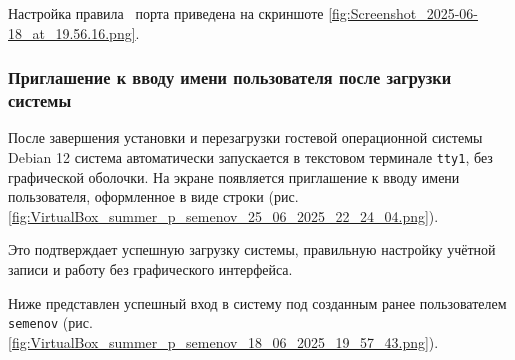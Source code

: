 Настройка правила \frqq\ порта приведена на скриншоте \ref{fig:Screenshot_2025-06-18_at_19.56.16.png}.


\subsubsection*{Приглашение к вводу имени пользователя после загрузки системы}

После завершения установки и перезагрузки гостевой операционной системы Debian 12 система автоматически запускается в текстовом терминале \texttt{tty1}, без графической оболочки. На экране появляется приглашение к вводу имени пользователя, оформленное в виде строки (рис. \ref{fig:VirtualBox_summer_p_semenov_25_06_2025_22_24_04.png}).


Это подтверждает успешную загрузку системы, правильную настройку учётной записи и работу без графического интерфейса.

Ниже представлен успешный вход в систему под созданным ранее пользователем \texttt{semenov} (рис. \ref{fig:VirtualBox_summer_p_semenov_18_06_2025_19_57_43.png}).

